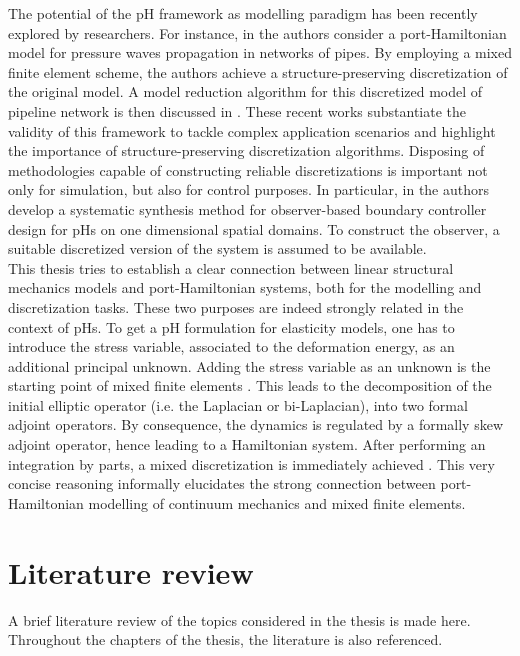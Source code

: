 The potential of the pH framework as modelling paradigm has been recently explored by researchers. For instance, in \cite{egger2018damped} the authors consider a port-Hamiltonian model for pressure waves propagation in networks of pipes. By employing a mixed finite element scheme, the authors achieve a structure-preserving discretization of the original model. A model reduction algorithm for this discretized model of pipeline network is then discussed in \cite{egger2018}. These recent works substantiate the validity of this framework to tackle complex application scenarios and highlight the importance of structure-preserving discretization algorithms. Disposing of methodologies capable of constructing reliable discretizations is important not only for simulation, but also for control purposes. In particular, in \cite{toledo2020} the authors develop a systematic synthesis method for observer-based boundary controller design for pHs on one dimensional spatial domains. To construct the observer, a suitable discretized version of the system is assumed to be available. \\

This thesis tries to establish a clear connection between linear structural mechanics models and port-Hamiltonian systems, both for the modelling and discretization tasks. These two purposes are indeed strongly related in the context of pHs. To get a pH formulation for elasticity models, one has to introduce the stress variable, associated to the deformation energy, as an additional principal unknown. Adding the stress variable as an unknown is the starting point of mixed finite elements \cite{arnold1990intro}. This leads to the decomposition of the initial elliptic operator (i.e. the Laplacian or bi-Laplacian), into two formal adjoint operators. By consequence, the dynamics is regulated by a formally skew adjoint operator, hence leading to a Hamiltonian system. After performing an integration by parts, a mixed discretization is immediately achieved \cite{joly2003variational}. This very concise reasoning informally elucidates the strong connection between port-Hamiltonian modelling of continuum mechanics and mixed finite elements. 


\section{Literature review}
A brief literature review of the topics considered in the thesis is made here. Throughout the chapters of the thesis, the literature is also referenced.


